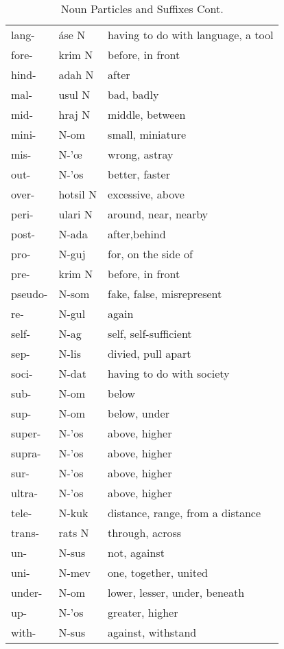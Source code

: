 \begin{table}[ht]
	\caption{Noun Particles and Suffixes Cont.}
	\centering
	\begin{tabular}{ l l l }
		\toprule
		lang- & áse N & having to do with language, a tool \\
		fore- & krim N & before, in front \\
		hind- & adah N & after \\
		mal- & usul N & bad, badly \\
		mid- & hraj N & middle, between \\
		mini- & N-om & small, miniature \\
		mis- & N-'œ & wrong, astray \\
		out- & N-'os & better, faster \\
		over- & hotsil N & excessive, above \\
		peri- & ulari N & around, near, nearby \\
		post- & N-ada & after,behind \\
		pro- & N-guj & for, on the side of \\
		pre- & krim N & before, in front \\
		pseudo- & N-som & fake, false, misrepresent \\
		re- & N-gul & again \\
		self- & N-ag & self, self-sufficient \\
		sep- & N-lis & divied, pull apart \\
		soci- & N-dat & having to do with society \\
		sub- & N-om & below \\
		sup- & N-om & below, under \\
		super- & N-'os & above, higher \\
		supra- & N-'os & above, higher \\
		sur- & N-'os & above, higher \\
		ultra- & N-'os & above, higher \\
		tele- & N-kuk & distance, range, from a distance \\
		trans- & rats N & through, across \\
		un- & N-sus & not, against \\
		uni- & N-mev & one, together, united \\
		under- & N-om & lower, lesser, under, beneath \\
		up- & N-'os & greater, higher \\
		with- & N-sus & against, withstand \\
		\bottomrule
	\end{tabular}
	\label{table:prefixes_2}
\end{table}
